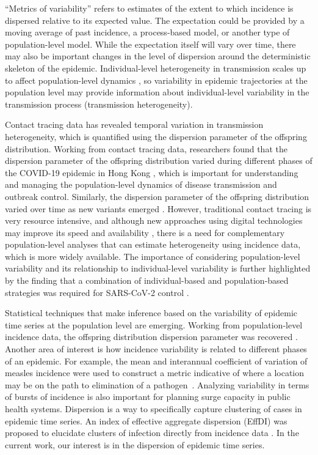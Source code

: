 \documentclass[10pt,letterpaper]{article}
\begin{document}
``Metrics of variability'' refers to estimates of the extent to which incidence is dispersed relative to its expected value.
The expectation could be provided by a moving average of past incidence, a process-based model, or another type of population-level model. 
While the expectation itself will vary over time, there may also be important changes in the level of dispersion around the deterministic skeleton of the epidemic. 
Individual-level heterogeneity in transmission scales up to affect population-level dynamics \cite{lloyd-smith_superspreading_2005}, so variability in epidemic trajectories at the population level may provide information about individual-level variability in the transmission process (transmission heterogeneity).

Contact tracing data has revealed temporal variation in transmission heterogeneity, which is quantified using the dispersion parameter of the offspring distribution.
Working from contact tracing data, researchers found that the dispersion parameter of the offspring distribution varied during different phases of the COVID-19 epidemic in Hong Kong \cite{guo2023statistical}, which is important for understanding and managing the population-level dynamics of disease transmission and outbreak control.
Similarly, the dispersion parameter of the offspring distribution varied over time as new variants emerged \cite{ko2023time}. 
However, traditional contact tracing is very resource intensive, and although new approaches using digital technologies may improve its speed and availability \cite{kretzschmar_impact_2020}, there is a need for complementary population-level analyses that can estimate heterogeneity using incidence data, which is more widely available. The importance of considering population-level variability and its relationship to individual-level variability is further highlighted by the finding that a combination of individual-based and population-based strategies was required for SARS-CoV-2 control \cite{sun_transmission_2021}. 

Statistical techniques that make inference based on the variability of epidemic time series at the population level are emerging. Working from population-level incidence data, the offspring distribution dispersion parameter was recovered \cite{kirkegaard_superspreading_2021}.
Another area of interest is how incidence variability is related to different phases of an epidemic. For example, the mean and interannual coefficient of variation of measles incidence were used to construct a metric indicative of where a location may be on the path to elimination of a pathogen~\cite{graham_measles_2019}. 
Analyzing variability in terms of bursts of incidence is also important for planning surge capacity in public health systems\cite{wallinga_metropolitan_2018}. 
Dispersion is a way to specifically capture clustering of cases in epidemic time series. 
An index of effective aggregate dispersion (EffDI) was proposed to elucidate clusters of infection directly from incidence data \cite{schneckenreither_assessing_2023}. In the current work, our interest is in the dispersion of epidemic time series.
\end{document}
